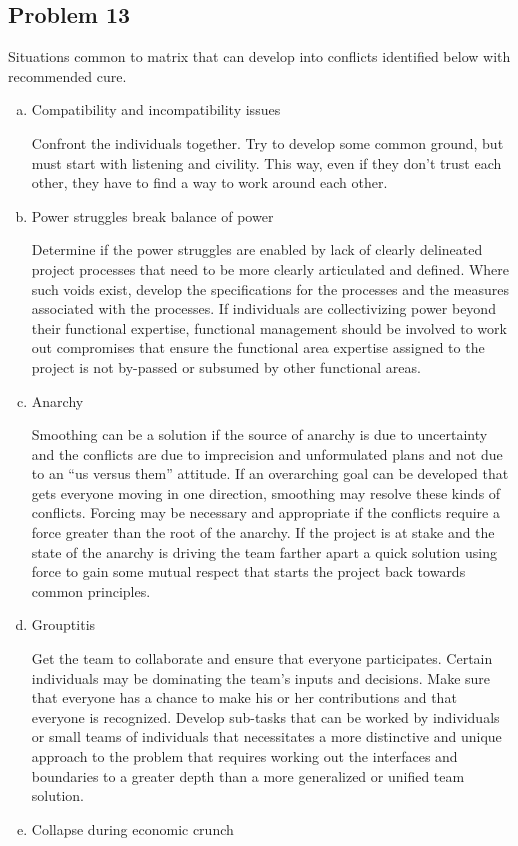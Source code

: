 \documentclass[letterpaper,10pt]{article}
\begin{document}
\subsection*{Problem 13}
Situations common to matrix that can develop into conflicts identified below with recommended cure.
\begin{enumerate}[a)]
\item Compatibility and incompatibility issues 

Confront the individuals together.  Try to develop some common ground, but must start with listening and civility.  This way, even if they don’t trust each other, they have to find a way to work around each other.  
\item Power struggles break balance of power

Determine if the power struggles are enabled by lack of clearly delineated project processes that need to be more clearly articulated and defined.  Where such voids exist, develop the specifications for the processes and the measures associated with the processes.  If individuals are collectivizing power beyond their functional expertise, functional management should be involved to work out compromises that ensure the functional area expertise assigned to the project is not by-passed or subsumed by other functional areas.
\item Anarchy

Smoothing can be a solution if the source of anarchy is due to uncertainty and the conflicts are due to imprecision and unformulated plans and not due to an “us versus them” attitude.  If an overarching goal can be developed that gets everyone moving in one direction, smoothing may resolve these kinds of conflicts.  Forcing may be necessary and appropriate if the conflicts require a force greater than the root of the anarchy.  If the project is at stake and the state of the anarchy is driving the team farther apart a quick solution using force to gain some mutual respect that starts the project back towards common principles.
\item Grouptitis

Get the team to collaborate and ensure that everyone participates.  Certain individuals may be dominating the team’s inputs and decisions.  Make sure that everyone has a chance to make his or her contributions and that everyone is recognized.  Develop sub-tasks that can be worked by individuals or small teams of individuals that necessitates a more distinctive and unique approach to the problem that requires working out the interfaces and boundaries to a greater depth than a more generalized or unified team solution.
\item Collapse during economic crunch


\end{enumerate}
\end{document}
